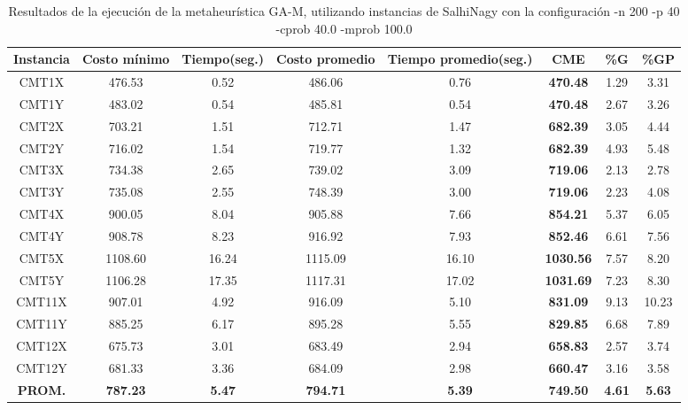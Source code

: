 \begin{table}[h]
\caption{Resultados de la ejecución de la metaheurística GA-M, utilizando instancias de SalhiNagy con la configuración -n 200 -p 40 -cprob 40.0 -mprob 100.0}
\centering
\small
\begin{tabular}{c c c c c c c c}
\hline\hline
Instancia & Costo mínimo & Tiempo(seg.) & Costo promedio & Tiempo promedio(seg.) & CME & \%G & \%GP \\ [0.5ex]
\hline
CMT1X & 476.53 & 0.52 & 
486.06 & 0.76 & \bf{470.48} & 
1.29 & 3.31\\CMT1Y & 483.02 & 0.54 & 
485.81 & 0.54 & \bf{470.48} & 
2.67 & 3.26\\CMT2X & 703.21 & 1.51 & 
712.71 & 1.47 & \bf{682.39} & 
3.05 & 4.44\\CMT2Y & 716.02 & 1.54 & 
719.77 & 1.32 & \bf{682.39} & 
4.93 & 5.48\\CMT3X & 734.38 & 2.65 & 
739.02 & 3.09 & \bf{719.06} & 
2.13 & 2.78\\CMT3Y & 735.08 & 2.55 & 
748.39 & 3.00 & \bf{719.06} & 
2.23 & 4.08\\CMT4X & 900.05 & 8.04 & 
905.88 & 7.66 & \bf{854.21} & 
5.37 & 6.05\\CMT4Y & 908.78 & 8.23 & 
916.92 & 7.93 & \bf{852.46} & 
6.61 & 7.56\\CMT5X & 1108.60 & 16.24 & 
1115.09 & 16.10 & \bf{1030.56} & 
7.57 & 8.20\\CMT5Y & 1106.28 & 17.35 & 
1117.31 & 17.02 & \bf{1031.69} & 
7.23 & 8.30\\CMT11X & 907.01 & 4.92 & 
916.09 & 5.10 & \bf{831.09} & 
9.13 & 10.23\\CMT11Y & 885.25 & 6.17 & 
895.28 & 5.55 & \bf{829.85} & 
6.68 & 7.89\\CMT12X & 675.73 & 3.01 & 
683.49 & 2.94 & \bf{658.83} & 
2.57 & 3.74\\CMT12Y & 681.33 & 3.36 & 
684.09 & 2.98 & \bf{660.47} & 
3.16 & 3.58\\\bf{PROM.} & 
\bf{787.23} & \bf{5.47} & \bf{794.71} & \bf{5.39} & \bf{749.50} & \bf{4.61} & \bf{5.63}\\[1ex]\hline
\end{tabular}
\label{table:nonlin}
\end{table} 

